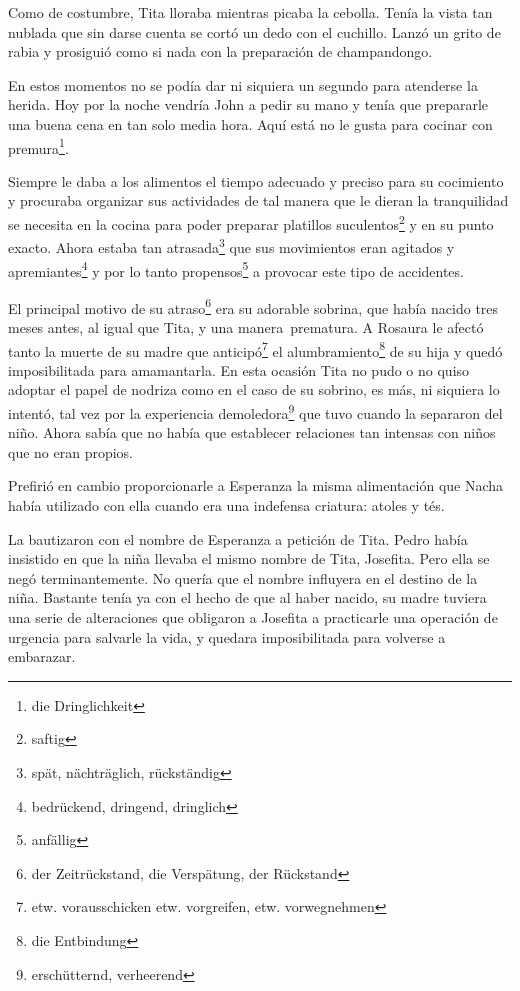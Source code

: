Como de costumbre, Tita lloraba mientras picaba la cebolla. Tenía la
vista tan nublada que sin darse cuenta se cortó un dedo con el cuchillo.
Lanzó un grito de rabia y prosiguió como si nada con la preparación de
champandongo.

En estos momentos no se podía dar ni siquiera un segundo para atenderse
la herida. Hoy por la noche vendría John a pedir su mano y tenía que
prepararle una buena cena en tan solo media hora. Aquí está no le gusta
para cocinar con premura\footnote{die Dringlichkeit}.

Siempre le daba a los alimentos el tiempo adecuado y preciso para su
cocimiento y procuraba organizar sus actividades de tal manera que le
dieran la tranquilidad se necesita en la cocina para poder preparar
platillos suculentos\footnote{saftig} y en su punto exacto.
Ahora estaba tan atrasada\footnote{spät, nächträglich, rückständig}
que sus movimientos eran agitados y apremiantes\footnote{bedrückend, dringend, dringlich}
y por lo tanto propensos\footnote{anfällig} a provocar este
tipo de accidentes.

El principal motivo de su atraso\footnote{der Zeitrückstand, die Verspätung, der Rückstand}
era su adorable sobrina, que había nacido tres meses antes, al igual
que Tita, y una manera~prematura. A Rosaura le afectó tanto la
muerte de su madre que anticipó\footnote{etw. vorausschicken etw. vorgreifen, etw. vorwegnehmen}
el alumbramiento\footnote{die Entbindung} de su hija y
quedó imposibilitada para amamantarla. En esta ocasión Tita no pudo o
no quiso adoptar el papel de nodriza como en el caso de su sobrino,
es más, ni siquiera lo intentó, tal vez por la experiencia demoledora\footnote{erschütternd, verheerend}
que tuvo cuando la separaron del niño. Ahora sabía que no había que
establecer relaciones tan intensas con niños que no eran propios.

Prefirió en cambio proporcionarle a Esperanza la misma alimentación que
Nacha había utilizado con ella cuando era una indefensa criatura: atoles
y tés.

La bautizaron con el nombre de Esperanza a petición de Tita. Pedro
había insistido en que la niña llevaba el mismo nombre de Tita,
Josefita. Pero ella se negó terminantemente. No quería que el nombre
influyera en el destino de la niña. Bastante tenía ya con el hecho de
que al haber nacido, su madre tuviera una serie de alteraciones que
obligaron a Josefita a practicarle una operación de urgencia para
salvarle la vida, y quedara imposibilitada para volverse a embarazar.

